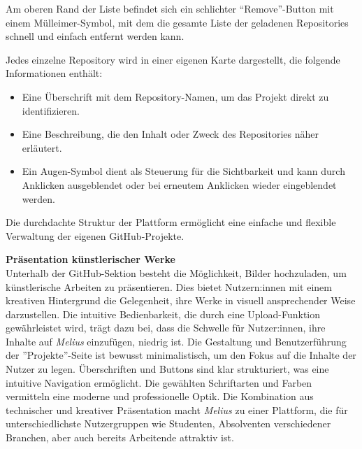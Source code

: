 Am oberen Rand der Liste befindet sich ein schlichter \textquotedblleft Remove\textquotedblright-Button mit einem Mülleimer-Symbol, mit dem die gesamte Liste der geladenen Repositories schnell und einfach entfernt werden kann.

Jedes einzelne Repository wird in einer eigenen Karte dargestellt, die folgende Informationen enthält:

\begin{itemize}
    \item Eine Überschrift mit dem Repository-Namen, um das Projekt direkt zu identifizieren.
\end{itemize}

\begin{itemize}
    \item Eine Beschreibung, die den Inhalt oder Zweck des Repositories näher erläutert.
\end{itemize}

\begin{itemize}
    \item Ein Augen-Symbol dient als Steuerung für die Sichtbarkeit und kann durch Anklicken ausgeblendet oder bei erneutem Anklicken wieder eingeblendet werden.
\end{itemize}

Die durchdachte Struktur der Plattform ermöglicht eine einfache und flexible Verwaltung der eigenen GitHub-Projekte.


\textbf{Präsentation künstlerischer Werke}
\\ Unterhalb der GitHub-Sektion besteht die Möglichkeit, Bilder hochzuladen, um künstlerische Arbeiten zu präsentieren. Dies bietet Nutzern:innen mit einem kreativen Hintergrund die Gelegenheit, ihre Werke in visuell ansprechender Weise darzustellen. Die intuitive Bedienbarkeit, die durch eine Upload-Funktion gewährleistet wird, trägt dazu bei, dass die Schwelle für Nutzer:innen, ihre Inhalte auf \textit{Melius} einzufügen, niedrig ist.
Die Gestaltung und Benutzerführung der \textquotedblright Projekte\textquotedblright-Seite ist bewusst minimalistisch, um den Fokus auf die Inhalte der Nutzer zu legen. Überschriften und Buttons sind klar strukturiert, was eine intuitive Navigation ermöglicht. Die gewählten Schriftarten und Farben vermitteln eine moderne und professionelle Optik. Die Kombination aus technischer und kreativer Präsentation macht \textit{Melius} zu einer Plattform, die für unterschiedlichste Nutzergruppen wie Studenten, Absolventen verschiedener Branchen, aber auch bereits Arbeitende attraktiv ist.


